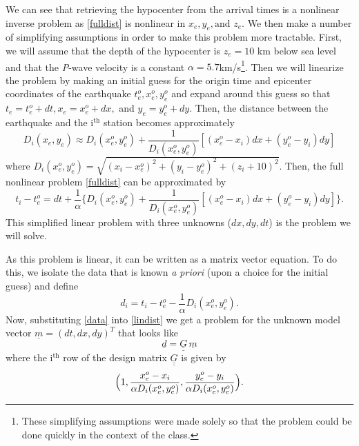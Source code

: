 \documentclass[12pt]{article}
\begin{document}
We can see that retrieving the hypocenter from the arrival times is a nonlinear inverse problem as \eqref{fulldist} is nonlinear in $x_e, y_e, \text{and } z_e$. We then make a number of simplifying assumptions in order to make this problem more tractable.
First, we will assume that the depth of the hypocenter is $z_e=10$ km below sea level and that the \textit{P}-wave velocity is a constant $\alpha=5.7$km/s\footnote{These simplifying assumptions were made solely so that the problem could be done quickly in the context of the class.}. Then we will linearize the problem by making an initial guess for the origin time and epicenter coordinates of the earthquake  $t^o_e, x^o_e, y^o_e$ and expand around this guess so that $t_e=t^o_e+dt, x_e=x^o_e+dx,$ and $y_e=y^o_e+dy$. Then, the distance between the earthquake and the $\text{i}^{\text{th}}$ station becomes approximately
\begin{equation}
\label{dist_expansion}
D_i(x_e,y_e)\approx D_i(x^o_e,y^o_e)+\frac{1}{D_i(x^o_e,y^o_e)}[(x^o_e-x_i)dx+(y^o_e-y_i)dy]
\end{equation}
where $D_i(x^o_e,y^o_e)=\sqrt{(x_i-x^o_e)^2+(y_i-y^o_e)^2+(z_i+10)^2}$. Then, the full nonlinear problem \eqref{fulldist} can be approximated by
\begin{equation}
\label{lindist}
t_i-t^o_e=dt+\frac{1}{\alpha}\{D_i(x^o_e,y^o_e)+\frac{1}{D_i(x^o_e,y^o_e)}[(x^o_e-x_i)dx+(y^o_e-y_i)dy]\}.
\end{equation}
This simplified linear problem with three unknowns ($dx, dy, dt$) is the problem we will solve.

As this problem is linear, it can be written as a matrix vector equation. To do this, we isolate the data that is known \textit{a priori} (upon a choice for the initial guess) and define
\begin{equation}
\label{data}
d_i=t_i-t^o_e-\frac{1}{\alpha}D_i(x^o_e,y^o_e).
\end{equation}
Now, substituting \eqref{data} into \eqref{lindist} we get a problem for the unknown model vector $\underline{m}=(dt,dx,dy)^T$ that looks like
\begin{equation}
\label{matrix_problem}
\underline{d}=\underline{\underline{G}}\,\underline{m}
\end{equation}
where the $\text{i}^{\text{th}}$ row of the design matrix $\underline{\underline{G}}$ is given by 
$$\Big{(}1, \frac{x^o_e-x_i}{\alpha D_i(x^o_e,y^o_e)},\frac{y^o_e-y_i}{\alpha D_i(x^o_e,y^o_e)}\Big{)}.$$
\end{document}
